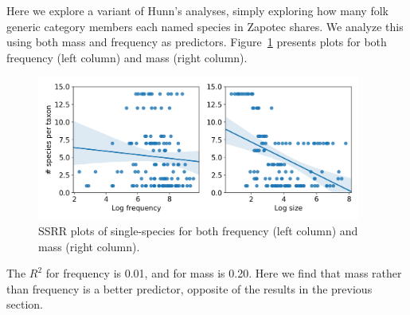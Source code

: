 \documentclass[10pt,letterpaper]{article}
\begin{document}


Here we explore a variant of Hunn's analyses, simply exploring how many folk generic category members each named species in Zapotec shares. We analyze this using both mass and frequency as predictors. Figure~\ref{fig-ssrr} presents plots for both frequency (left column) and mass (right column).

\begin{figure}[t!]
  \begin{center}
    \includegraphics[width=0.95\textwidth]{./figures/ssrr-singlespecies.png}
        \caption{SSRR plots of single-species for both frequency (left column) and mass (right column).}
        \label{fig-ssrr}
  \end{center}
\end{figure}

The $R^2$ for frequency is 0.01, and for mass is 0.20. Here we find that mass rather than frequency is a better predictor, opposite of the results in the previous section.
\end{document}

